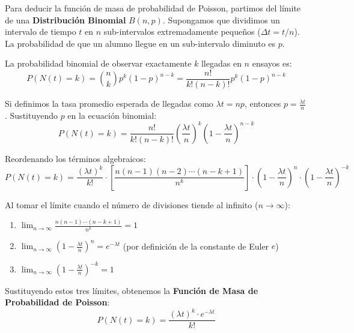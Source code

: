 \documentclass[12pt,letterpaper]{article}
\begin{document}
Para deducir la función de masa de probabilidad de Poisson, partimos del límite de una \textbf{Distribución Binomial} $B(n, p)$. Supongamos que dividimos un intervalo de tiempo $t$ en $n$ sub-intervalos extremadamente pequeños ($\Delta t = t/n$). La probabilidad de que un alumno llegue en un sub-intervalo diminuto es $p$.

La probabilidad binomial de observar exactamente $k$ llegadas en $n$ ensayos es:
\begin{equation}
	P(N(t) = k) = \binom{n}{k} p^k (1-p)^{n-k} = \frac{n!}{k!(n-k)!} p^k (1-p)^{n-k}
\end{equation}

Si definimos la tasa promedio esperada de llegadas como $\lambda t = n p$, entonces $p = \frac{\lambda t}{n}$. Sustituyendo $p$ en la ecuación binomial:
\begin{equation}
	P(N(t) = k) = \frac{n!}{k!(n-k)!} \left(\frac{\lambda t}{n}\right)^k \left(1 - \frac{\lambda t}{n}\right)^{n-k}
\end{equation}

Reordenando los términos algebraicos:
\begin{equation}
	P(N(t) = k) = \frac{(\lambda t)^k}{k!} \cdot \left[ \frac{n(n-1)(n-2)\cdots(n-k+1)}{n^k} \right] \cdot \left(1 - \frac{\lambda t}{n}\right)^n \cdot \left(1 - \frac{\lambda t}{n}\right)^{-k}
\end{equation}

Al tomar el límite cuando el número de divisiones tiende al infinito ($n \to \infty$):
\begin{enumerate}
	\item $\lim_{n \to \infty} \frac{n(n-1)\cdots(n-k+1)}{n^k} = 1$
	\item $\lim_{n \to \infty} \left(1 - \frac{\lambda t}{n}\right)^n = e^{-\lambda t}$ (por definición de la constante de Euler $e$)
	\item $\lim_{n \to \infty} \left(1 - \frac{\lambda t}{n}\right)^{-k} = 1$
\end{enumerate}

Sustituyendo estos tres límites, obtenemos la \textbf{Función de Masa de Probabilidad de Poisson}:
\begin{equation}
	P(N(t) = k) = \frac{(\lambda t)^k \cdot e^{-\lambda t}}{k!}
\end{equation}
\end{document}
